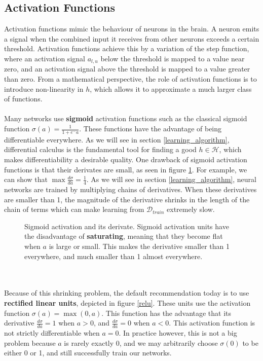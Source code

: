 \subsection{Activation Functions}
\label{activation_functions}
Activation functions mimic the behaviour of neurons in the brain. A neuron emits a signal when the combined input it receives from other neurons exceeds a certain threshold. Activation functions achieve this by a variation of the step function, where an activation signal $a_{l,u}$ below the threshold is mapped to a value near zero, and an activation signal above the threshold is mapped to a value greater than zero. From a mathematical perspective, the role of activation functions is to introduce non-linearity in $h$, which allows it to approximate a much larger class of functions.
\\\\
Many networks use \textbf{sigmoid} activation functions such as the classical sigmoid function $\sigma(a) = \frac{1}{1 + e^-a}$. These functions have the advantage of being differentiable everywhere. As we will see in section \ref{learning_algorithm}, differential calculus is the fundamental tool for finding a good $h \in \mathcal{H}$, which makes differentiability a desirable quality. One drawback of sigmoid activation functions is that their derivates are small, as seen in figure \ref{sigmoid}. For example, we can show that $\max \frac{d\sigma}{da} = \frac{1}{4}$. As we will see in section \ref{learning_algorithm}, neural networks are trained by multiplying chains of derivatives. When these derivatives are smaller than 1, the magnitude of the derivative shrinks in the length of the chain of terms which can make learning from $\mathcal{D}_{train}$ extremely slow.
\begin{figure}
	\centering
	
	\caption{Sigmoid activation and its derivate. Sigmoid activation units have the disadvantage of \textbf{saturating}, meaning that they become flat when $a$ is large or small. This makes the derivative smaller than 1 everywhere, and much smaller than 1 almost everywhere.}
	\label{sigmoid}
\end{figure}
\\\\
Because of this shrinking problem, the default recommendation today is to use \textbf{rectified linear units}, depicted in figure \ref{relu}. These units use the activation function $\sigma(a) = \max(0, a)$. This function has the advantage that its derivative $\frac{d\sigma}{da} = 1$ when $a > 0$, and $\frac{d\sigma}{da} = 0$ when $a < 0$. This activation function is not strictly differentiable when $a = 0$. In practice however, this is not a big problem because $a$ is rarely exactly 0, and we may arbitrarily choose $\sigma(0)$ to be either 0 or 1, and still successfully train our networks.
